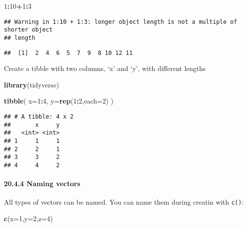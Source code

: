 \documentclass[
]{article}
\newenvironment{Shaded}{\begin{snugshade}}{\end{snugshade}}
\newcommand{\AttributeTok}[1]{\textcolor[rgb]{0.13,0.29,0.53}{#1}}
\newcommand{\DecValTok}[1]{\textcolor[rgb]{0.00,0.00,0.81}{#1}}
\newcommand{\FunctionTok}[1]{\textcolor[rgb]{0.13,0.29,0.53}{\textbf{#1}}}
\newcommand{\NormalTok}[1]{#1}
\newcommand{\SpecialCharTok}[1]{\textcolor[rgb]{0.81,0.36,0.00}{\textbf{#1}}}
\begin{document}
\begin{Shaded}
\begin{Highlighting}[]
\DecValTok{1}\SpecialCharTok{:}\DecValTok{10}\SpecialCharTok{+}\DecValTok{1}\SpecialCharTok{:}\DecValTok{3}
\end{Highlighting}
\end{Shaded}

\begin{verbatim}
## Warning in 1:10 + 1:3: longer object length is not a multiple of shorter object
## length
\end{verbatim}

\begin{verbatim}
##  [1]  2  4  6  5  7  9  8 10 12 11
\end{verbatim}

Create a tibble with two columns, `x' and `y', with different lengths

\begin{Shaded}
\begin{Highlighting}[]
\FunctionTok{library}\NormalTok{(tidyverse)}



\FunctionTok{tibble}\NormalTok{(}
  \AttributeTok{x=}\DecValTok{1}\SpecialCharTok{:}\DecValTok{4}\NormalTok{,}
  \AttributeTok{y=}\FunctionTok{rep}\NormalTok{(}\DecValTok{1}\SpecialCharTok{:}\DecValTok{2}\NormalTok{,}\AttributeTok{each=}\DecValTok{2}\NormalTok{)}
\NormalTok{)}
\end{Highlighting}
\end{Shaded}

\begin{verbatim}
## # A tibble: 4 x 2
##       x     y
##   <int> <int>
## 1     1     1
## 2     2     1
## 3     3     2
## 4     4     2
\end{verbatim}

\hypertarget{naming-vectors}{%
\paragraph{20.4.4 Naming vectors}\label{naming-vectors}}

All types of vectors can be named. You can name them during creatin with
\texttt{c()}:

\begin{Shaded}
\begin{Highlighting}[]
\FunctionTok{c}\NormalTok{(}\AttributeTok{x=}\DecValTok{1}\NormalTok{,}\AttributeTok{y=}\DecValTok{2}\NormalTok{,}\AttributeTok{z=}\DecValTok{4}\NormalTok{)}
\end{Highlighting}
\end{Shaded}
\end{document}
